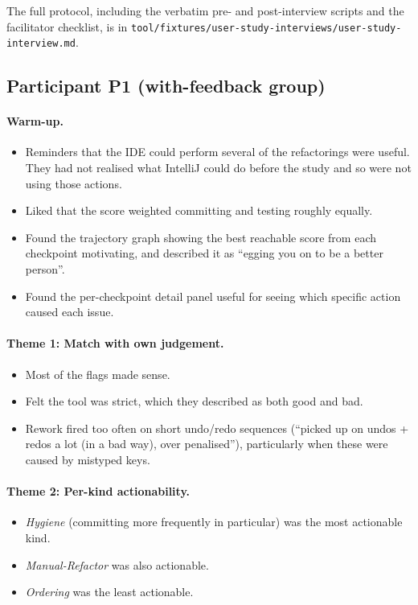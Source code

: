 The full protocol, including the verbatim pre- and post-interview scripts and the facilitator checklist, is in \texttt{tool/fixtures/user-study-interviews/user-study-interview.md}.

\subsection{Participant P1 (with-feedback group)}

\paragraph{Warm-up.}
\begin{itemize}
  \item Reminders that the IDE could perform several of the refactorings were useful. They had not realised what IntelliJ could do before the study and so were not using those actions.
  \item Liked that the score weighted committing and testing roughly equally.
  \item Found the trajectory graph showing the best reachable score from each checkpoint motivating, and described it as ``egging you on to be a better person''.
  \item Found the per-checkpoint detail panel useful for seeing which specific action caused each issue.
\end{itemize}

\paragraph{Theme 1: Match with own judgement.}
\begin{itemize}
  \item Most of the flags made sense.
  \item Felt the tool was strict, which they described as both good and bad.
  \item Rework fired too often on short undo/redo sequences (``picked up on undos + redos a lot (in a bad way), over penalised''), particularly when these were caused by mistyped keys.
\end{itemize}

\paragraph{Theme 2: Per-kind actionability.}
\begin{itemize}
  \item \emph{Hygiene} (committing more frequently in particular) was the most actionable kind.
  \item \emph{Manual-Refactor} was also actionable.
  \item \emph{Ordering} was the least actionable.
\end{itemize}

